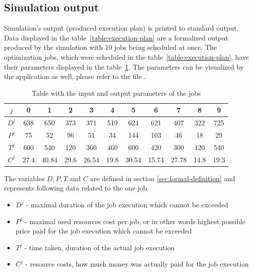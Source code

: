 \subsection{Simulation output}\label{subsec:simulation-output}

Simulation's output (produced execution plan) is printed to standard output.
Data displayed in the table~\ref{table:execution-plan} are a formalized output produced by the simulation with 10 jobs being scheduled at once.
The optimization jobs,
which were scheduled in the table~\ref{table:execution-plan},
have their parameters displayed in the table~\ref{table:jobs-parameters}. 
The parameters can be visualized by the application as well, 
please refer to the file .

\begin{table}[ht]
	\centering
	\caption{Table with the input and output parameters of the jobs}
	\begin{tabular}{|c|c c c c c c c c c c|} 
		\hline
		$j$       & 0   & 1     & 2   & 3     & 4     & 5     & 6     & 7     & 8     & 9 \\
		\hline\hline
		$D^{j}$   & 638 & 650   & 373 & 371   & 519   & 624   & 621   & 407   & 322   & 725 \\
		\hline
		$P^{j}$   & 75  & 52    & 96  & 51    & 34    & 144   & 103   & 46    & 18    & 29 \\
		\hline\hline
		$T^{j}$   & 600 & 540   & 120 & 360   & 460   & 600   & 420   & 300   & 120   & 540  \\
		\hline
		$C^{j}$   & 27.4& 40.84 & 29.6& 26.54 & 19.8  & 30.54 & 15.74 & 27.78 & 14.8  & 19.3 \\
		\hline
	\end{tabular}
	\label{table:jobs-parameters}
\end{table}

The variables $D,P,T$ and $C$ are defined in section \ref{sec:formal-definition}
and represents following data related to the one job.
\begin{itemize}
	\item $D^{j}$ - maximal duration of the job execution which cannot be exceeded
	\item $P^{j}$ - maximal used resources cost per job,
	      or in other words highest possible price paid for the job execution which cannot be exceeded
	\item $T^{j}$ - time taken, duration of the actual job execution
	\item $C^{j}$ - resource costs, how much money was actually paid for the job execution
\end{itemize}

